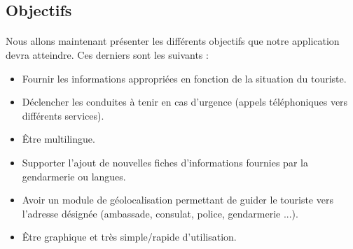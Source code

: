 \subsection{Objectifs}
	
	\paragraph{}
		Nous allons maintenant présenter les différents objectifs que notre application devra atteindre. Ces derniers sont les suivants :
\begin{itemize}
	\item Fournir les informations appropriées en fonction de la situation du touriste.
	\item Déclencher les conduites à tenir en cas d'urgence (appels téléphoniques vers différents services).
	\item Être multilingue.
	\item Supporter l'ajout de nouvelles fiches d'informations fournies par la gendarmerie ou langues.
	\item Avoir un module de géolocalisation permettant de guider le touriste vers l'adresse désignée (ambassade, consulat, police, gendarmerie ...).
	\item Être graphique et très simple/rapide d'utilisation.
\end{itemize}